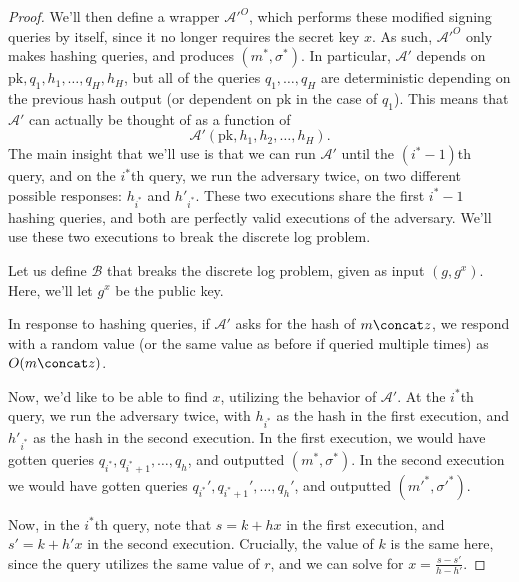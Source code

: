 \begin{proof}
    We'll then define a wrapper $\mathcal{A}'^{O}$, which performs these modified signing queries by itself, since it no longer requires the secret key $x$. As such, $\mathcal{A}'^O$ only makes hashing queries, and produces $(m^*, \sigma^*)$. In particular, $\mathcal{A}'$ depends on $\mathrm{pk}, q_1, h_1, \ldots, q_H, h_H$, but all of the queries $q_1, \ldots, q_H$ are deterministic depending on the previous hash output (or dependent on pk in the case of $q_1$). This means that $\mathcal{A}'$ can actually be thought of as a function of
    \[
        \mathcal{A}'(\mathrm{pk}, h_1, h_2, \ldots, h_H)
    .\]
    The main insight that we'll use is that we can run $\mathcal{A}'$ until the $(i^* - 1)$th query, and on the $i^*$th query, we run the adversary twice, on two different possible responses: $h_{i^*}$ and $h'_{i^*}$. These two executions share the first $i^* - 1$ hashing queries, and both are perfectly valid executions of the adversary. We'll use these two executions to break the discrete log problem.

    Let us define $\mathcal{B}$ that breaks the discrete log problem, given as input $(g, g^x)$. Here, we'll let $g^x$ be the public key.

    In response to hashing queries, if $\mathcal{A}'$ asks for the hash of $m \concat z$, we respond with a random value (or the same value as before if queried multiple times) as $O(m \concat z)$.

    Now, we'd like to be able to find $x$, utilizing the behavior of $\mathcal{A}'$.
    At the $i^*$th query, we run the adversary twice, with $h_{i^*}$ as the hash in the first execution, and $h'_{i^*}$ as the hash in the second execution. In the first execution, we would have gotten queries $q_{i^*}, q_{i^*+1}, \ldots, q_h$, and outputted $(m^*, \sigma^*)$. In the second execution we would have gotten queries $q_{i^*}', q_{i^*+1}', \ldots, q_h'$, and outputted $(m'^*, \sigma'^*)$.

    Now, in the $i^*$th query, note that $s = k + hx$ in the first execution, and $s' = k + h' x$ in the second execution. Crucially, the value of $k$ is the same here, since the query utilizes the same value of $r$, and we can solve for $x = \frac{s - s'}{h - h'}$.


\end{proof}
